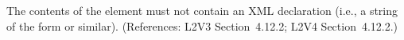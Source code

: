 The contents of the  element must not contain an XML
declaration (i.e., a string of the form  or similar).  (References: L2V3
Section~4.12.2; L2V4 Section~4.12.2.)

